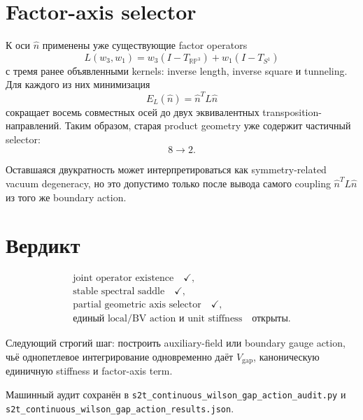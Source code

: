 \documentclass[12pt,a4paper]{article}
\begin{document}
\section{Factor-axis selector}

К оси \(\hat n\) применены уже существующие factor operators
\begin{equation}
 L(w_3,w_1)
 =w_3(I-T_{\mathbb{RP}^3})+w_1(I-T_{S^1})
\end{equation}
с тремя ранее объявленными kernels: inverse length, inverse square и
tunneling. Для каждого из них минимизация
\begin{equation}
 E_L(\hat n)=\hat n^TL\hat n
\end{equation}
сокращает восемь совместных осей до двух эквивалентных
transposition-направлений. Таким образом, старая product geometry уже
содержит частичный selector:
\begin{equation}
 8\longrightarrow2.
\end{equation}

Оставшаяся двукратность может интерпретироваться как symmetry-related vacuum
degeneracy, но это допустимо только после вывода самого coupling
\(\hat n^TL\hat n\) из того же boundary action.

\section{Вердикт}

\begin{equation}
 \boxed{
 \begin{gathered}
 \text{joint operator existence}\quad\checkmark,\\
 \text{stable spectral saddle}\quad\checkmark,\\
 \text{partial geometric axis selector}\quad\checkmark,\\
 \text{единый local/BV action и unit stiffness}\quad\text{открыты}.
 \end{gathered}
 }
\end{equation}

Следующий строгий шаг: построить auxiliary-field или boundary gauge action,
чьё однопетлевое интегрирование одновременно даёт
\(V_{\mathrm{gap}}\), каноническую единичную stiffness и factor-axis term.

Машинный аудит сохранён в
\texttt{s2t\_continuous\_wilson\_gap\_action\_audit.py} и
\texttt{s2t\_continuous\_wilson\_gap\_action\_results.json}.
\end{document}
